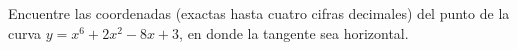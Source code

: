 \item Encuentre las coordenadas (exactas hasta cuatro cifras decimales) del punto de la curva $y = x^6 + 2x^2 - 8x + 3$, en donde la tangente sea horizontal.

